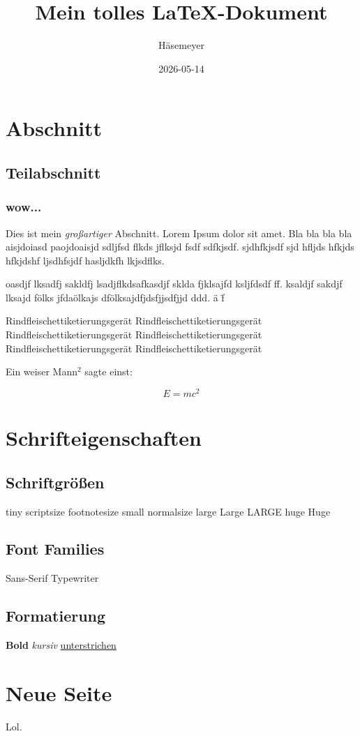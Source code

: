 \documentclass{article}
\title{Mein tolles \LaTeX-Dokument}
\author{Häsemeyer}
\date{2026-05-14}
\begin{document}
\maketitle
\tableofcontents
\newpage

\section{Abschnitt}

\subsection{Teilabschnitt}

\subsubsection{wow...}

Dies ist mein {\em großartiger} Abschnitt. Lorem Ipsum dolor sit amet.
Bla bla bla bla aisjdoiasd paojdoaisjd sdljfsd flkds jflksjd fsdf sdfkjsdf.
sjdhfkjsdf sjd hfljds hfkjds hfkjdshf ljsdhfsjdf hasljdkfh lkjsdflks.

oasdjf lksadfj sakldfj lsadjflkdsafkasdjf sklda fjklsajfd ksljfdsdf ff.
ksaldjf sakdjf lksajd fölks jfdaölkajs dfölksajdfjdsfjjsdfjjd ddd. \"a \"f %

Rindfleischettiketierungsgerät Rindfleischettiketierungsgerät Rindfleischettiketierungsgerät Rindfleischettiketierungsgerät Rindfleischettiketierungsgerät Rindfleischettiketierungsgerät

Ein weiser Mann$^2$ sagte einst:

\[ E=mc^2 \]

\section{Schrifteigenschaften}

\subsection{Schriftgrößen}

{\tiny tiny}
{\scriptsize scriptsize}
{\footnotesize footnotesize}
{\small small}
{\normalsize normalsize}
{\large large}
{\Large Large}
{\LARGE LARGE}
{\huge huge}
{\Huge Huge}

\subsection{Font Families}

{\sffamily Sans-Serif}
{\ttfamily Typewriter}

\subsection{Formatierung}

{\bfseries Bold}
{\itshape kursiv}
\underline{unterstrichen}

\newpage

\section{Neue Seite}

Lol.
\lipsum[1-2]
\end{document}
